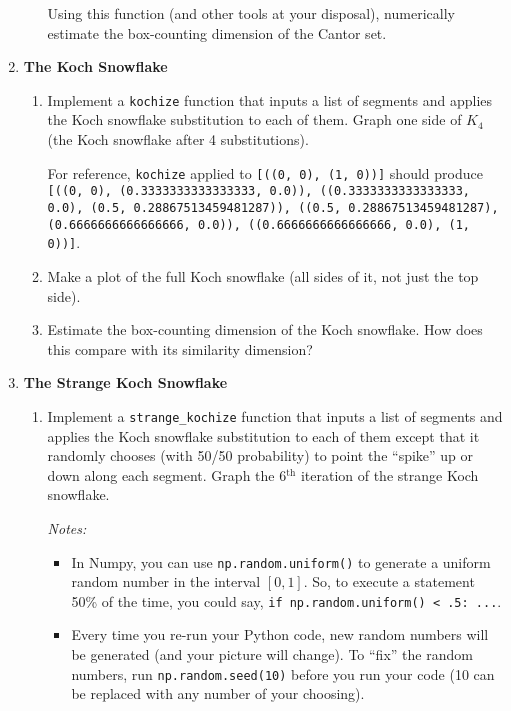 \documentclass[letter]{article}
\begin{document}
\begin{enumerate}
\begin{enumerate}
					Using this function (and other tools at your disposal),
					numerically estimate the box-counting dimension of the Cantor set.
			\end{enumerate}
		\item {\bf The Koch Snowflake} 
			\begin{enumerate}
				\item Implement a \verb|kochize| function that inputs a list of segments and applies the Koch snowflake
					substitution to each of them. Graph one side of $K_4$ (the Koch snowflake after 4 substitutions).

					For reference, \verb|kochize| applied to {\tt [((0, 0), (1, 0))]} should produce
					{\tt  [((0, 0), (0.3333333333333333, 0.0)), ((0.3333333333333333, 0.0), (0.5, 0.28867513459481287)), ((0.5, 0.28867513459481287), (0.6666666666666666, 0.0)), ((0.6666666666666666, 0.0), (1, 0))]}.
				\item Make a plot of the full Koch snowflake (all sides of it, not just the top side).
				\item Estimate the box-counting dimension of the Koch snowflake. How does this compare with
					its similarity dimension?
			\end{enumerate}
		\item {\bf The Strange Koch Snowflake} 
			\begin{enumerate}
				\item Implement a \verb|strange_kochize| function that inputs a list of segments and applies the Koch snowflake
					substitution to each of them except that it randomly chooses (with 50/50 probability) 
					to point the ``spike'' up or
					down along each segment. Graph the 6$^\text{th}$ iteration of the strange Koch snowflake.
					
					\emph{Notes:}
					\begin{itemize}
						\item In Numpy, you can use \verb|np.random.uniform()| to generate
					a uniform random number in the interval $[0,1]$. So, to execute a statement 50\% of the time,
					you could say, \verb|if np.random.uniform() < .5: ...|.

						\item Every time you re-run your Python code, new random numbers will be generated (and your picture will
					change). To ``fix'' the random numbers, run \verb|np.random.seed(10)| before you run your code (10 can
					be replaced with any number of your choosing).
					\end{itemize}


\end{enumerate}
\end{enumerate}
\end{document}
